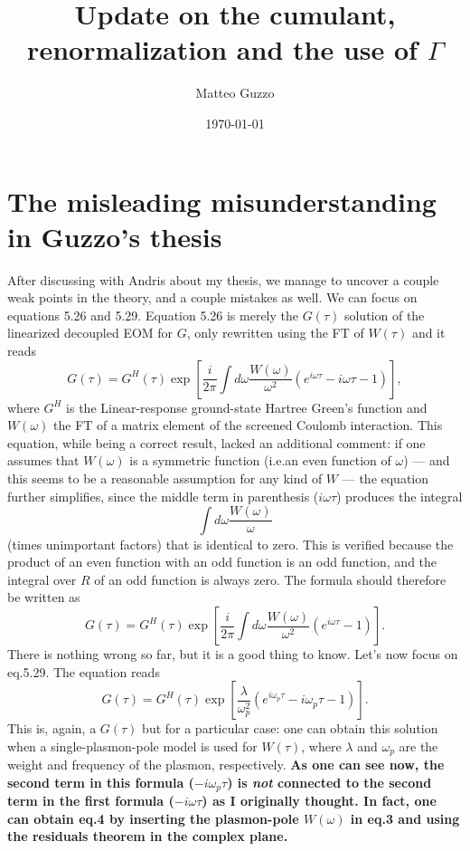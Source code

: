 \documentclass[a4paper,12pt]{article}
\title{Update on the cumulant, renormalization and the use of $\Gamma$}
\author{Matteo Guzzo}
\date{\today}
\def\be{\begin{equation}}
\def\ee{\end{equation}}
\begin{document}
\maketitle

\tableofcontents

\section{The misleading misunderstanding in Guzzo's thesis}

After discussing with Andris about my thesis, we manage to uncover a couple weak 
points in the theory, and a couple mistakes as well. 
We can focus on equations 5.26 and 5.29. 
Equation 5.26 is merely the $G(\tau)$ solution of the linearized decoupled EOM for $G$, only 
rewritten using the FT of ${W}(\tau)$  
and it reads
\be
 G(\tau) = G^H (\tau) \exp \left[ \frac{i}{2\pi}  \int \! d\omega \frac{ W (\omega) }{ \omega^2 } 
   \left( e^{i\omega\tau} - i \omega \tau - 1 \right) \right] ,
\ee 
where $G^H$ is the Linear-response ground-state Hartree Green's function and 
$W(\omega)$ the FT of a matrix element of the screened Coulomb interaction. 
This equation, while being a correct result, lacked an additional comment: 
if one assumes that $W(\omega)$ is a symmetric function (i.e.\@ an even function of $\omega$) 
--- and this seems to be a reasonable assumption for any kind of $W$ --- 
the equation further simplifies, since the middle term in parenthesis ($i\omega\tau$)
produces the integral 
\be
  \int \! d\omega \frac{ W (\omega) }{ \omega } 
\ee 
(times unimportant factors) that is identical to zero. 
This is verified because the product of an even function with an odd function is an odd function, 
and the integral over $R$ of an odd function is always zero. 
The formula should therefore be written as 
\be
 G(\tau) = G^H (\tau) \exp \left[ \frac{i}{2\pi}  \int \! d\omega \frac{ W (\omega) }{ \omega^2 } 
   \left( e^{i\omega\tau} - 1 \right) \right] . 
\ee 
There is nothing wrong so far, but it is a good thing to know. 
Let's now focus on eq.\@ 5.29. 
The equation reads
\be
 G(\tau) = G^H (\tau) \exp \left[ \frac{\lambda}{\omega_p^2}  
   \left( e^{i\omega_p\tau} - i \omega_p \tau - 1 \right) \right] . 
\ee
This is, again, a $G(\tau)$ but for a particular case: one can obtain this solution when a 
single-plasmon-pole model is used for $W(\tau)$, where $\lambda$ and $\omega_p$ are 
the weight and frequency of the plasmon, respectively. 
\textbf{As one can see now, the second term in this formula ($-i\omega_p\tau$) is \emph{not} 
connected to the second term in the first formula ($-i\omega\tau$) as I originally thought. 
In fact, one can obtain eq.\@ 4 by inserting the plasmon-pole $W(\omega)$ in eq.\@ 3 and using the
residuals theorem in the complex plane.}
\end{document}

